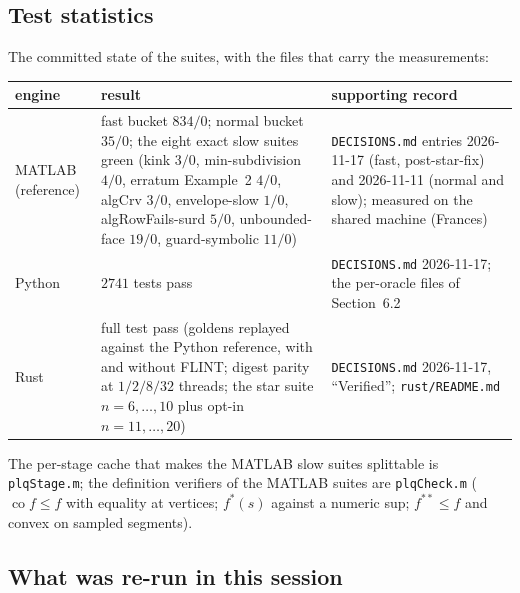 \documentclass[11pt]{article}
\theoremstyle{definition}
\DeclareMathOperator{\co}{co}
\begin{document}
\subsection{Test statistics}

The committed state of the suites, with the files that carry the measurements:

\begin{center}
\begin{tabular}{p{2.8cm}p{5.7cm}p{6.3cm}}
\toprule
engine & result & supporting record \\
\midrule
MATLAB (reference) & fast bucket $834/0$; normal bucket $35/0$; the eight
  exact slow suites green (kink $3/0$, min-subdivision $4/0$, erratum
  Example~2 $4/0$, algCrv $3/0$, envelope-slow $1/0$, algRowFails-surd $5/0$,
  unbounded-face $19/0$, guard-symbolic $11/0$) & \texttt{DECISIONS.md}
  entries 2026-11-17 (fast, post-star-fix) and 2026-11-11 (normal and slow);
  measured on the shared machine (Frances)
\\
Python & $2741$ tests pass & \texttt{DECISIONS.md} 2026-11-17;
  the per-oracle files of
  Section~6.2
\\
Rust & full test pass (goldens replayed against the Python reference, with and
  without FLINT; digest parity at $1/2/8/32$ threads; the star suite
  $n=6,\ldots,10$ plus opt-in $n=11,\ldots,20$) & \texttt{DECISIONS.md}
  2026-11-17, ``Verified''; \texttt{rust/README.md}
\\
\bottomrule
\end{tabular}
\end{center}

\noindent
The per-stage cache that makes the MATLAB slow suites splittable is
\texttt{plqStage.m}; the definition verifiers of the MATLAB suites are
\texttt{plqCheck.m} ($\co f \le f$ with equality at vertices; $f^*(s)$ against
a numeric sup; $f^{**}\le f$ and convex on sampled segments).

\subsection{What was re-run in this session}
\end{document}
